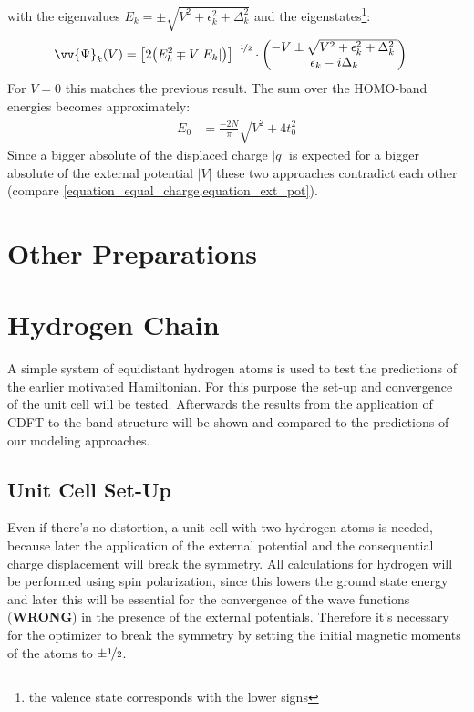 with the eigenvalues $E_k = \pm \sqrt{V^2+\epsilon_k^2+\Delta_k^2}$ and the eigenstates\footnote{the valence state corresponds with the lower signs}:
\begin{align}
	\vv{\Psi}_k(V) &= \left[2\left(E_k^2\mp V|E_k|\right)\right]^{\nicefrac{-1}{2}} \cdot \begin{pmatrix*}[c]
	-V\pm \sqrt{V^2+\epsilon_k^2+\Delta_k^2}\\
	\epsilon_k - i \Delta_k
	\end{pmatrix*}
\end{align}
For $V=0$ this matches the previous result. 
The sum over the HOMO-band energies becomes approximately:
\begin{align}
	E_0 &= \frac{-2N}{\pi} \sqrt{V^2+4t_0^2}
	\label{equation_ext_pot}
\end{align} 
Since a bigger absolute of the displaced charge $\left|q\right|$ is expected for a bigger absolute of the external potential $\left|V\right|$ these two approaches contradict each other (compare \cref{equation_equal_charge,equation_ext_pot}).

\section{Other Preparations}

\section{Hydrogen Chain}

A simple system of equidistant hydrogen atoms is used to test the predictions of the earlier motivated Hamiltonian. For this purpose the set-up and convergence of the unit cell will be tested. Afterwards the results from the application of CDFT to the band structure will be shown and compared to the predictions of our modeling approaches.

\subsection{Unit Cell Set-Up}
Even if there's no distortion, a unit cell with two hydrogen atoms is needed, because later the application of the external potential and the consequential charge displacement will break the symmetry. All calculations for hydrogen will be performed using spin polarization, since this lowers the ground state energy and later this will be essential for the convergence of the wave functions (\textbf{WRONG}) in the presence of the external potentials. Therefore it's necessary for the optimizer to break the symmetry by setting the initial magnetic moments of the atoms to $\pm\nicefrac{1}{2}$. 


